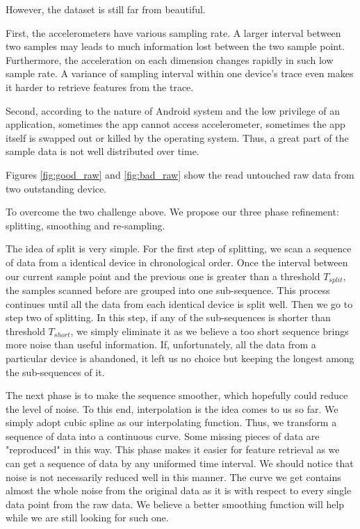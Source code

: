 \documentclass{article} %
\begin{document}
However, the dataset is still far from beautiful.

First, the accelerometers have various sampling rate. A larger interval between two samples may leads to much information lost between the two sample point. Furthermore, the acceleration on each dimension changes rapidly in such low sample rate. A variance of sampling interval within one device's trace even makes it harder to retrieve features from the trace.

Second, according to the nature of Android system and the low privilege of an application, sometimes the app cannot access accelerometer, sometimes the app itself is swapped out or killed by the operating system. Thus, a great part of the sample data is not well distributed over time.

Figures \ref{fig:good_raw} and \ref{fig:bad_raw} show the read untouched raw data from two outstanding device. 

To overcome the two challenge above. We propose our three phase refinement: splitting, smoothing and re-sampling.

The idea of split is very simple. For the first step of splitting, we scan a sequence of data from a identical device in chronological order. Once the interval between our current sample point and the previous one is greater than a threshold $T_{split}$, the samples scanned before are grouped into one sub-sequence. This process continues until all the data from each identical device is split well. Then we go to step two of splitting. In this step, if any of the sub-sequences is shorter than threshold $T_{short}$, we simply eliminate it as we believe a too short sequence brings more noise than useful information. If, unfortunately, all the data from a particular device is abandoned, it left us no choice but keeping the longest among the sub-sequences of it.

The next phase is to make the sequence smoother, which hopefully could reduce the level of noise. To this end, interpolation is the idea comes to us so far. We simply adopt cubic spline as our interpolating function. Thus, we transform a sequence of data into a continuous curve. Some missing pieces of data are "reproduced" in this way. This phase makes it easier for feature retrieval as we can get a sequence of data by any uniformed time interval. We should notice that noise is not necessarily reduced well in this manner. The curve we get contains almost the whole noise from the original data as it is with respect to every single data point from the raw data. We believe a better smoothing function will help while we are still looking for such one.
\end{document}
